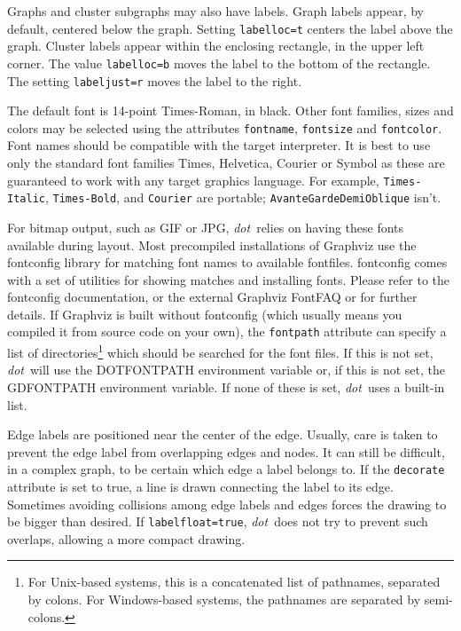 \documentclass[11pt]{article}
\def\dot{{\it dot}}
\begin{document}

Graphs and cluster subgraphs may also have labels. Graph labels
appear, by default, centered below the graph. Setting {\tt labelloc=t}
centers the label above the graph. Cluster labels appear within the
enclosing rectangle, in the upper left corner. The value {\tt labelloc=b}
moves the label to the bottom of the rectangle. The setting
{\tt labeljust=r} moves the label to the right.

The default font is 14-point Times-Roman, in black.
Other font families, sizes and colors may be selected using the
attributes {\tt fontname}, {\tt fontsize} and {\tt fontcolor}.
Font names should be compatible with the target interpreter.
It is best to use only the standard font families
Times, Helvetica, Courier or Symbol as these are guaranteed to work
with any target graphics language.
For example, \verb"Times-Italic", \verb"Times-Bold", and \verb"Courier"
are portable; {\tt AvanteGarde\-DemiOblique} isn't.

For bitmap output, such as GIF or JPG, \dot\ relies on having these
fonts available during layout. Most precompiled installations of
Graphviz use the fontconfig library for matching font names to
available fontfiles. fontconfig comes with a set of utilities for
showing matches and installing fonts. Please refer to the fontconfig
documentation, or the external Graphviz FontFAQ or for further details.
If Graphviz is built without fontconfig (which usually means you
compiled it from source code on your own), the {\tt fontpath} attribute
can specify a list of directories\footnote{For Unix-based systems, this is
a concatenated list of pathnames, separated by colons. For Windows-based
systems, the pathnames are separated by semi-colons.} which should be 
searched for the font files. If this is not set, 
\dot\ will use the DOTFONTPATH environment variable or, if this is not
set, the GDFONTPATH environment variable. If none of these is set, \dot\
uses a built-in list.

Edge labels are positioned near the center of the edge. Usually, care
is taken to prevent the edge label from overlapping edges and
nodes. It can still be difficult, in a complex graph, to be certain
which edge a label belongs to. If the {\tt decorate} attribute is set
to true, a line is drawn connecting the label to its edge. Sometimes
avoiding collisions among edge labels and edges forces the
drawing to be bigger than desired. If {\tt labelfloat=true}, 
\dot\ does not try to prevent such overlaps, allowing a more compact
drawing.
\end{document}
